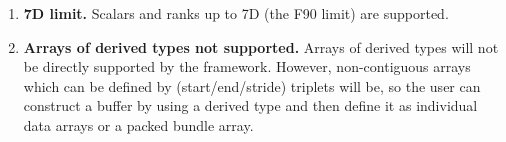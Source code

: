 

\begin{enumerate}

\item {\bf 7D limit.}  Scalars and ranks up to 7D (the F90 limit) are 
supported.

\item {\bf Arrays of derived types not supported.}  Arrays of derived 
types will not be directly supported by the framework.
However, non-contiguous arrays which can be defined by (start/end/stride)
triplets will be, so the user can construct a buffer by using a derived
type and then define it as individual data arrays or a packed bundle array.

\end{enumerate}